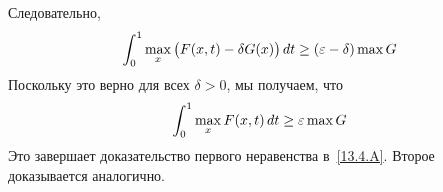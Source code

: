 Следовательно,
\[
\int_{0}^{1}\max_{x}\big(F(x,t)-\delta G(x)\big)\,d t
\geq
(\varepsilon-\delta)\max G
\]
Поскольку это верно для всех  $\delta > 0$, мы получаем, что
\[
\int_{0}^{1}\max_{x} F(x,t)\,d t
\geq
\varepsilon\max G
\]
Это завершает доказательство первого неравенства в~\ref{13.4.A}.
Второе доказывается аналогично.






